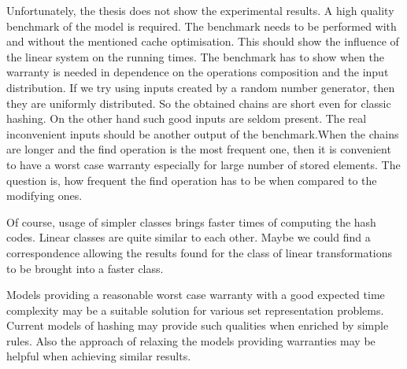 Unfortunately, the thesis does not show the experimental results. A high quality benchmark of the model is required. The benchmark needs to be performed with and without the mentioned cache optimisation. This should show the influence of the linear system on the running times. The benchmark has to show when the warranty is needed in dependence on the operations composition and the input distribution. If we try using inputs created by a random number generator, then they are uniformly distributed. So the obtained chains are short even for classic hashing. On the other hand such good inputs are seldom present. The real inconvenient inputs should be another output of the benchmark.When the chains are longer and the find operation is the most frequent one, then it is convenient to have a worst case warranty especially for large number of stored elements. The question is, how frequent the find operation has to be when compared to the modifying ones.

Of course, usage of simpler classes brings faster times of computing the hash codes. Linear classes are quite similar to each other. Maybe we could find a correspondence allowing the results found for the class of linear transformations to be brought into a faster class.

Models providing a reasonable worst case warranty with a good expected time complexity may be a suitable solution for various set representation problems. Current models of hashing may provide such qualities when enriched by simple rules. Also the approach of relaxing the models providing warranties may be helpful when achieving similar results.
